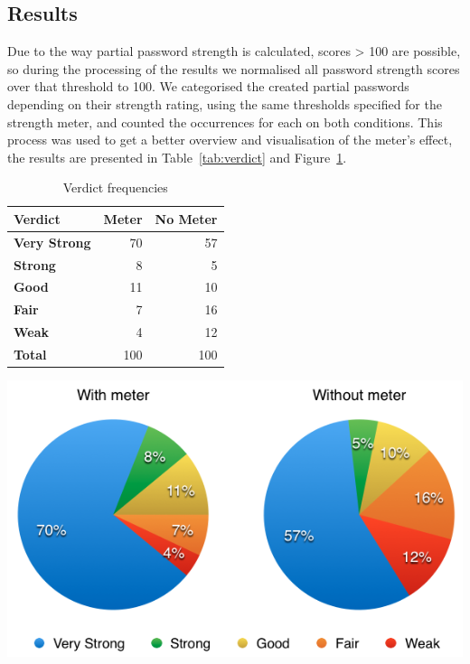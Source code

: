   \subsection{Results}
    \label{ssec:usability_results}
    Due to the way partial password strength is calculated, scores > 100 are possible, so during the processing of the results we normalised all password strength scores over that threshold to 100. We categorised the created partial passwords depending on their strength rating, using the same thresholds specified for the strength meter, and counted the occurrences for each on both conditions. This process was used to get a better overview and visualisation of the meter's effect, the results are presented in Table~\ref{tab:verdict} and Figure~\ref{fig:verdict}.

    \begin{table}[htpb]
      \hspace*{-1.5cm}
      \begin{minipage}[b]{0.3\linewidth}
        \centering
        \scriptsize
        \begin{tabular}{ l r r}
          \toprule
          \textbf{Verdict} & \textbf{Meter} & \textbf{No Meter} \\ \midrule
          \textbf{Very Strong} & 70 & 57 \\
          \textbf{Strong} & 8 & 5 \\
          \textbf{Good} & 11 & 10 \\
          \textbf{Fair} & 7 & 16 \\
          \textbf{Weak} & 4 & 12 \\ \midrule
          \textbf{Total} & 100 & 100 \\ \bottomrule
        \end{tabular}
          \caption{Verdict frequencies}
          \label{tab:verdict}
      \end{minipage}\hfill
      \begin{minipage}[b]{0.7\linewidth}
        \centering
        \includegraphics[width=\linewidth]{Images/results-str}
        \label{fig:verdict}
      \end{minipage}
    \end{table}

